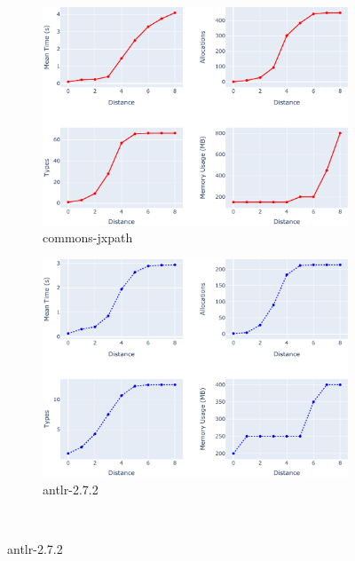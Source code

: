 \begin{figure}[htbp]
\centering
\begin{subfigure}[b]{0.45\textwidth}
\captionsetup{margin=0cm}  %
\includegraphics[width=\textwidth]{figures/commons-jxpath_distance_evaluation.pdf}
\caption{commons-jxpath}
\end{subfigure}
\vspace{0.5cm}
\hfill
\begin{subfigure}[b]{0.45\textwidth}
\captionsetup{margin=0cm}  %
\includegraphics[width=\textwidth]{figures/antlr-2.7.2_distance_evaluation.pdf}
\caption{antlr-2.7.2}
\end{subfigure}
\vspace{0.5cm}
\\

\end{figure}
